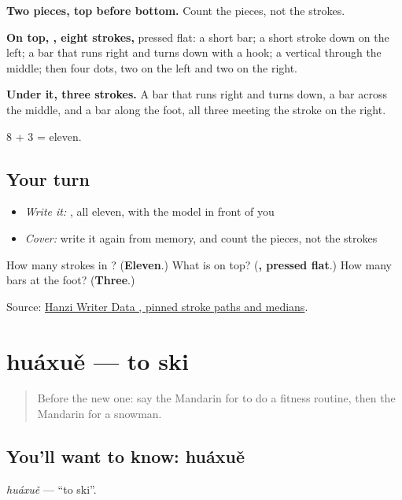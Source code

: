 \begin{quote}
\end{quote}

\textbf{Two pieces, top before bottom.} Count the pieces, not the strokes.

\textbf{On top, , eight strokes,} pressed flat: a short bar; a short stroke down on the left; a bar that runs right and turns down with a hook; a vertical through the middle; then four dots, two on the left and two on the right.

\textbf{Under it, three strokes.} A bar that runs right and turns down, a bar across the middle, and a bar along the foot, all three meeting the stroke on the right.

8 + 3 = eleven.

\subsection*{Your turn}
\begin{itemize}
\raggedright
  \item \emph{Write it:} , all eleven, with the model in front of you
  \item \emph{Cover:} write it again from memory, and count the pieces, not the strokes
\end{itemize}

\begin{tcolorbox}[breakable,colback=teal!4,colframe=teal!35!black,title={Before you move on}]
How many strokes in ? (\textbf{Eleven}.) What is on top? (\textbf{, pressed flat}.) How many bars at the foot? (\textbf{Three}.)

Source: \href{https://raw.githubusercontent.com/chanind/hanzi-writer-data/68d10a4b21150cae5e1ebbd223eed289cf32d90c/data/\%E9\%9B\%AA.json}{Hanzi Writer Data , pinned stroke paths and medians}.
\end{tcolorbox}
\section[huáxuě]{huáxuě — to ski}

\label{lesson:ZH-C221-huaxue}



\begin{quote}
Before the new one: say the Mandarin for to do a fitness routine, then the Mandarin for a snowman.
\end{quote}

\subsection*{You'll want to know: huáxuě}
\emph{huáxuě} — \textquotedblleft{}to ski\textquotedblright{}.

